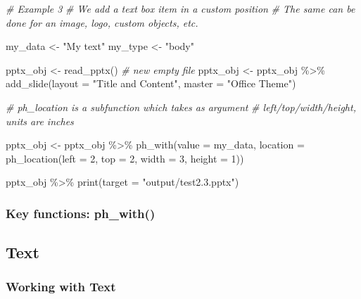 \documentclass[
]{book}
\newenvironment{Shaded}{\begin{snugshade}}{\end{snugshade}}
\newcommand{\AttributeTok}[1]{\textcolor[rgb]{0.77,0.63,0.00}{#1}}
\newcommand{\CommentTok}[1]{\textcolor[rgb]{0.56,0.35,0.01}{\textit{#1}}}
\newcommand{\DecValTok}[1]{\textcolor[rgb]{0.00,0.00,0.81}{#1}}
\newcommand{\FunctionTok}[1]{\textcolor[rgb]{0.00,0.00,0.00}{#1}}
\newcommand{\NormalTok}[1]{#1}
\newcommand{\OtherTok}[1]{\textcolor[rgb]{0.56,0.35,0.01}{#1}}
\newcommand{\SpecialCharTok}[1]{\textcolor[rgb]{0.00,0.00,0.00}{#1}}
\newcommand{\StringTok}[1]{\textcolor[rgb]{0.31,0.60,0.02}{#1}}
\begin{document}
\begin{Shaded}
\begin{Highlighting}[]
\CommentTok{\# Example 3}
\CommentTok{\# We add a text box item in a custom position}
\CommentTok{\# The same can be done for an image, logo, custom objects, etc.}

\NormalTok{my\_data }\OtherTok{\textless{}{-}} \StringTok{"My text"}
\NormalTok{my\_type }\OtherTok{\textless{}{-}} \StringTok{"body"}

\NormalTok{pptx\_obj }\OtherTok{\textless{}{-}} \FunctionTok{read\_pptx}\NormalTok{() }\CommentTok{\# new empty file}
\NormalTok{pptx\_obj }\OtherTok{\textless{}{-}}\NormalTok{ pptx\_obj }\SpecialCharTok{\%\textgreater{}\%}
  \FunctionTok{add\_slide}\NormalTok{(}\AttributeTok{layout =} \StringTok{"Title and Content"}\NormalTok{, }\AttributeTok{master =} \StringTok{"Office Theme"}\NormalTok{)}

\CommentTok{\# ph\_location is a subfunction which takes as argument }
\CommentTok{\# left/top/width/height, units are inches}

\NormalTok{pptx\_obj }\OtherTok{\textless{}{-}}\NormalTok{ pptx\_obj }\SpecialCharTok{\%\textgreater{}\%}
  \FunctionTok{ph\_with}\NormalTok{(}\AttributeTok{value =}\NormalTok{ my\_data, }\AttributeTok{location =} \FunctionTok{ph\_location}\NormalTok{(}\AttributeTok{left =} \DecValTok{2}\NormalTok{, }\AttributeTok{top =} \DecValTok{2}\NormalTok{, }\AttributeTok{width =} \DecValTok{3}\NormalTok{, }\AttributeTok{height =} \DecValTok{1}\NormalTok{))}

\NormalTok{pptx\_obj }\SpecialCharTok{\%\textgreater{}\%}
  \FunctionTok{print}\NormalTok{(}\AttributeTok{target =} \StringTok{"output/test2.3.pptx"}\NormalTok{) }
\end{Highlighting}
\end{Shaded}

\hypertarget{key-functions-ph_with}{%
\subsubsection{Key functions: ph\_with()}\label{key-functions-ph_with}}

\hypertarget{text-1}{%
\subsection{Text}\label{text-1}}

\hypertarget{working-with-text}{%
\subsubsection{Working with Text}\label{working-with-text}}
\end{document}
